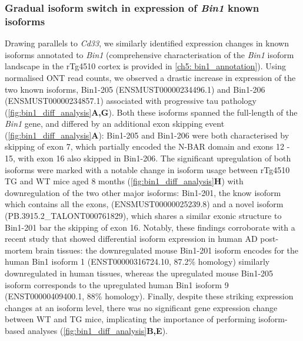 \subsubsection{Gradual isoform switch in expression of \textit{Bin1} known isoforms}
Drawing parallels to \textit{Cd33}, we similarly identified expression changes in known isoforms annotated to \textit{Bin1} (comprehensive characterisation of the \textit{Bin1} isoform landscape in the rTg4510 cortex is provided in \cref{ch5: bin1_annotation}). Using normalised ONT read counts, we observed a drastic increase in expression of the two known isoforms, Bin1-205 (ENSMUST00000234496.1) and Bin1-206 (ENSMUST00000234857.1) associated with progressive tau pathology (\cref{fig:bin1_diff_analysis}\textbf{A,G}). Both these isoforms spanned the full-length of the \textit{Bin1} gene, and differed by an additional exon skipping event (\cref{fig:bin1_diff_analysis}\textbf{A}): Bin1-205 and Bin1-206 were both characterised by skipping of exon 7, which partially encoded the N-BAR domain and exons 12 - 15, with exon 16 also skipped in Bin1-206. The significant upregulation of both isoforms were marked with a notable change in isoform usage between rTg4510 TG and WT mice aged 8 months (\cref{fig:bin1_diff_analysis}\textbf{H}) with downregulation of the two other major isoforms: Bin1-201, the know isoform which contains all the exons, (ENSMUST00000025239.8) and a novel isoform (PB.3915.2\_TALONT000761829), which shares a similar exonic structure to Bin1-201 bar the skipping of exon 16. Notably, these findings corroborate with a recent study that showed differential isoform expression in human AD post-mortem brain tissues\cite{Taga2020}: the downregulated mouse Bin1-201 isoform encodes for the human Bin1 isoform 1 (ENST00000316724.10, 87.2\% homology) similarly downregulated in human tissues, whereas the upregulated mouse Bin1-205 isoform corresponds to the upregulated human Bin1 isoform 9 (ENST00000409400.1, 88\% homology). Finally, despite these striking expression changes at an isoform level, there was no significant gene expression change between WT and TG mice, implicating the importance of performing isoform-based analyses (\cref{fig:bin1_diff_analysis}\textbf{B,E}). 

